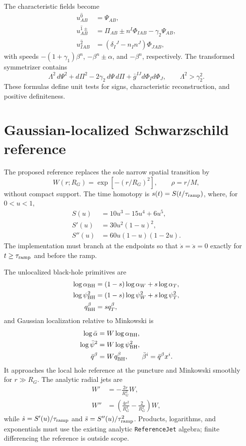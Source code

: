 \documentclass[11pt]{article}
\newcommand{\code}[1]{\texttt{#1}}
\begin{document}
The characteristic fields become
\begin{align}
 u^{\hat 0}_{AB}&=\Psi_{AB},\\
 u^{\hat 1\pm}_{AB}&=\Pi_{AB}\pm n^I\Phi_{IAB}-\gamma_2\Psi_{AB},\\
 u^{\hat 2}_{IAB}&=(\delta_I{}^J-n_In^J)\Phi_{JAB},
\end{align}
with speeds $-(1+\gamma_1)\beta^n$, $-\beta^n\pm\alpha$, and
$-\beta^n$, respectively.  The transformed symmetrizer contains
\begin{equation}
 \Lambda^2\,d\Psi^2+d\Pi^2-2\gamma_2\,d\Psi\,d\Pi
 +\bar g^{IJ}d\Phi_I d\Phi_J,
 \qquad \Lambda^2>\gamma_2^2.
\end{equation}
These formulas define unit tests for signs, characteristic reconstruction, and
positive definiteness.

\section{Gaussian-localized Schwarzschild reference}

The proposed reference replaces the sole narrow spatial transition by
\begin{equation}
 W(r;R_G)=\exp[-(r/R_G)^2],\qquad \rho=r/M,
\end{equation}
without compact support.  The time homotopy is $s(t)=S(t/\tau_{\rm ramp})$,
where, for $0<u<1$,
\begin{align}
 S(u)&=10u^3-15u^4+6u^5,\\
 S'(u)&=30u^2(1-u)^2,\\
 S''(u)&=60u(1-u)(1-2u).
\end{align}
The implementation must branch at the endpoints so that $\dot s=\ddot s=0$
exactly for $t\ge\tau_{\rm ramp}$ and before the ramp.

The unlocalized black-hole primitives are
\begin{align}
 \log\alpha_{\rm BH}&=(1-s)\log\alpha_W+s\log\alpha_T,\\
 \log\psi^2_{\rm BH}&=(1-s)\log\psi^2_W+s\log\psi^2_T,\\
 q^\beta_{\rm BH}&=s q^\beta_T,
\end{align}
and Gaussian localization relative to Minkowski is
\begin{align}
 \log\bar\alpha &= W\log\alpha_{\rm BH},\\
 \log\bar\psi^2 &= W\log\psi^2_{\rm BH},\\
 \bar q^\beta &= Wq^\beta_{\rm BH},\qquad
 \bar\beta^i=\bar q^\beta x^i.
\end{align}
It approaches the local hole reference at the puncture and Minkowski smoothly
for $r\gg R_G$.  The analytic radial jets are
\begin{align}
 W'&=-\frac{2r}{R_G^2}W,\\
 W''&=\left(\frac{4r^2}{R_G^4}-\frac{2}{R_G^2}\right)W,
\end{align}
while $\dot s=S'(u)/\tau_{\rm ramp}$ and
$\ddot s=S''(u)/\tau_{\rm ramp}^2$.  Products, logarithms, and exponentials
must use the existing analytic \code{ReferenceJet} algebra; finite differencing
the reference is outside scope.
\end{document}

